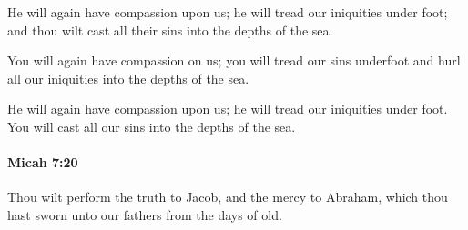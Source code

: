 			\begin{versebox}
					\item[BHS] 
					\item[LXX] 
					\item[ASV] He will again have compassion upon us; he will tread our iniquities under foot; and thou wilt cast all their sins into the depths of the sea.
					\item[NIV] You will again have compassion on us; you will tread our sins underfoot and hurl all our iniquities into the depths of the sea.
					\item[NRSV] He will again have compassion upon us; he will tread our iniquities under foot. You will cast all our sins into the depths of the sea.
			\end{versebox}

		\paragraph{Micah 7:20} %
			\label{MICAH-7-20}

			Thou wilt perform the truth to Jacob, and the mercy to Abraham, which thou hast sworn unto our fathers from the days of old.

